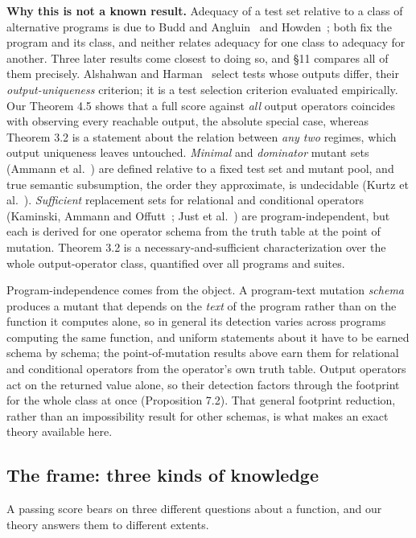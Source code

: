 \documentclass[conference]{IEEEtran}
\theoremstyle{run}
\begin{document}
\textbf{Why this is not a known result.} Adequacy of a test set relative to a class of alternative programs is due to Budd and Angluin~\cite{budd1982} and Howden~\cite{howden1982}; both fix the program and its class, and neither relates adequacy for one class to adequacy for another. Three later results come closest to doing so, and \S 11 compares all of them precisely. Alshahwan and Harman~\cite{alshahwan2014} select tests whose outputs differ, their \emph{output-uniqueness} criterion; it is a test selection criterion evaluated empirically. Our Theorem 4.5 shows that a full score against \emph{all} output operators coincides with observing every reachable output, the absolute special case, whereas Theorem 3.2 is a statement about the relation between \emph{any two} regimes, which output uniqueness leaves untouched. \emph{Minimal} and \emph{dominator} mutant sets (Ammann et al.~\cite{ammann2014}) are defined relative to a fixed test set and mutant pool, and true semantic subsumption, the order they approximate, is undecidable (Kurtz et al.~\cite{kurtz2015}). \emph{Sufficient} replacement sets for relational and conditional operators (Kaminski, Ammann and Offutt~\cite{kaminski2013}; Just et al.~\cite{just2012}) are program-independent, but each is derived for one operator schema from the truth table at the point of mutation. Theorem 3.2 is a necessary-and-sufficient characterization over the whole output-operator class, quantified over all programs and suites.

Program-independence comes from the object. A program-text mutation \emph{schema} produces a mutant that depends on the \emph{text} of the program rather than on the function it computes alone, so in general its detection varies across programs computing the same function, and uniform statements about it have to be earned schema by schema; the point-of-mutation results above earn them for relational and conditional operators from the operator's own truth table. Output operators act on the returned value alone, so their detection factors through the footprint for the whole class at once (Proposition 7.2). That general footprint reduction, rather than an impossibility result for other schemas, is what makes an exact theory available here.

\setcounter{subsection}{1}
\subsection{The frame: three kinds of knowledge}
A passing score bears on three different questions about a function, and our theory answers them to different extents.
\end{document}
